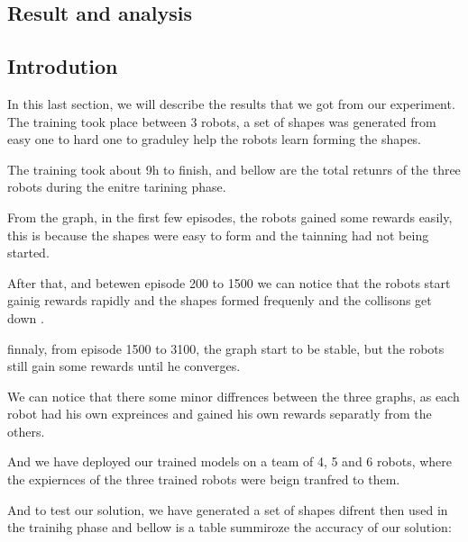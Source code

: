 \documentclass[12pt]{extarticle}
\begin{document}
\afterpage{\clearpage}





\newpage
\pagebreak
\hspace{0pt}
\vfill
\begin{center}
\section{Result and analysis}
\end{center}
\vfill
\hspace{0pt}

\pagebreak

\subsection{Introdution}

In this last section, we will describe the results that we got from our experiment.
The training took place between 3 robots, a set of shapes was generated from easy one to hard one to graduley help the robots learn forming the shapes.


The training took about 9h to finish, and bellow are the total retunrs of the three robots during the enitre tarining phase.

 
From the graph, in  the first few episodes, the robots gained some rewards easily, this is because the shapes were easy to form and the tainning had not being started.

After that, and betewen episode 200 to 1500 we can notice that the robots start gainig rewards rapidly and the shapes formed  frequenly and the collisons  get down .

finnaly, from episode 1500 to 3100, the graph start to be stable, but the robots still gain some rewards until he converges.

We can notice that there  some minor diffrences between the three graphs, as each robot had his own expreinces and gained his own rewards separatly from the others.


And we have deployed our trained models on a team of 4, 5 and 6 robots, where the expiernces of the three trained robots were beign tranfred to them.

And to test our solution, we have generated a set of shapes difrent then used in the trainihg phase  and bellow is a table summiroze the accuracy of our solution:\\
\end{document}
